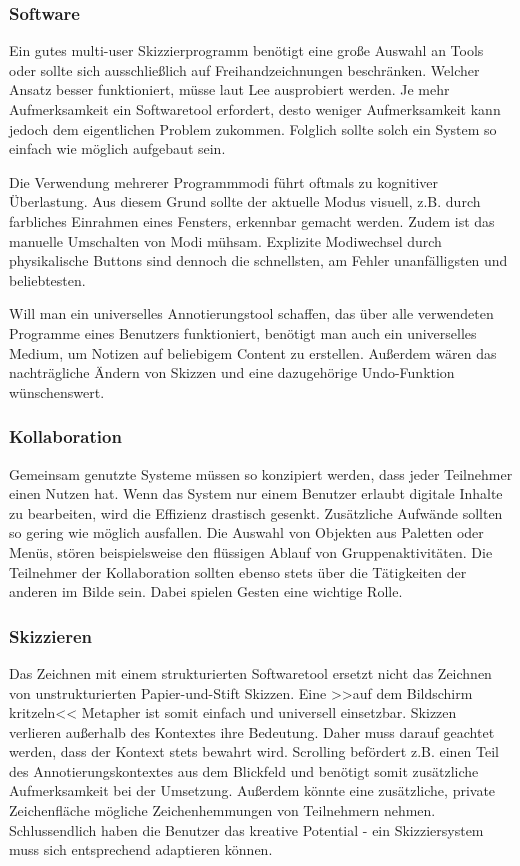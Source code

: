 \subsubsection*{Software} Ein gutes multi-user Skizzierprogramm benötigt eine große Auswahl an Tools oder sollte sich ausschließlich auf Freihandzeichnungen beschränken. Welcher Ansatz besser funktioniert, müsse laut Lee ausprobiert werden. Je mehr Aufmerksamkeit ein Softwaretool erfordert, desto weniger Aufmerksamkeit kann jedoch dem eigentlichen Problem zukommen. Folglich sollte solch ein System so einfach wie möglich aufgebaut sein.

Die Verwendung mehrerer Programmmodi führt oftmals zu kognitiver Überlastung. Aus diesem Grund sollte der aktuelle Modus visuell, z.B. durch farbliches Einrahmen eines Fensters, erkennbar gemacht werden. Zudem ist das manuelle Umschalten von Modi mühsam. Explizite Modiwechsel durch physikalische Buttons sind dennoch die schnellsten, am Fehler unanfälligsten und beliebtesten. 

Will man ein universelles Annotierungstool schaffen, das über alle verwendeten Programme eines Benutzers funktioniert, benötigt man auch ein universelles Medium, um Notizen auf beliebigem Content zu erstellen. Außerdem wären das nachträgliche Ändern von Skizzen und eine dazugehörige Undo-Funktion wünschenswert.

\subsubsection*{Kollaboration} Gemeinsam genutzte Systeme müssen so konzipiert werden, dass jeder Teilnehmer einen Nutzen hat. Wenn das System nur einem Benutzer erlaubt digitale Inhalte zu bearbeiten, wird die Effizienz drastisch gesenkt. Zusätzliche Aufwände sollten so gering wie möglich ausfallen. Die Auswahl von Objekten aus Paletten oder Menüs, stören beispielsweise den flüssigen Ablauf von Gruppenaktivitäten. Die Teilnehmer der Kollaboration sollten ebenso stets über die Tätigkeiten der anderen im Bilde sein. Dabei spielen Gesten eine wichtige Rolle.

\subsubsection*{Skizzieren} Das Zeichnen mit einem strukturierten Softwaretool ersetzt nicht das Zeichnen von unstrukturierten Papier-und-Stift Skizzen. Eine >>auf dem Bildschirm kritzeln<< Metapher ist somit einfach und universell einsetzbar. Skizzen verlieren außerhalb des Kontextes ihre Bedeutung. Daher muss darauf geachtet werden, dass der Kontext stets bewahrt wird. Scrolling befördert z.B. einen Teil des Annotierungskontextes aus dem Blickfeld und benötigt somit zusätzliche Aufmerksamkeit bei der Umsetzung. Außerdem könnte eine zusätzliche, private Zeichenfläche mögliche Zeichenhemmungen von Teilnehmern nehmen. Schlussendlich haben die Benutzer das kreative Potential - ein Skizziersystem muss sich entsprechend adaptieren können.

